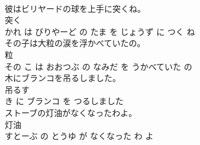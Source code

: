 \documentclass[8pt]{extreport}
\begin{document}
\begin{CJK}{UTF8}{min}
\\	彼はビリヤードの球を上手に突くね。	
\\	突く 
\\	かれ は びりやーど の たま を じょうず に つく ね			
\\	その子は大粒の涙を浮かべていたの。	
\\	粒 
\\	その こ は おおつぶ の なみだ を うかべていた の			
\\	木にブランコを吊るしました。	
\\	吊るす 
\\	き に ブランコ を つるしました			
\\	ストーブの灯油がなくなったわよ。	
\\	灯油 
\\	すとーぶ の とうゆ が なくなった わ よ			
\end{CJK}
\end{document}
